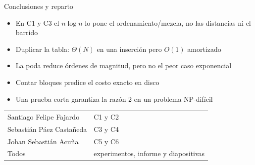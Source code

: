\documentclass[11pt,aspectratio=169]{beamer}
\newcommand{\Th}{\Theta}
\begin{document}
\begin{frame}{Conclusiones y reparto}
\small
\begin{itemize}
\item En C1 y C3 el $n\log n$ lo pone el ordenamiento/mezcla, no las distancias ni el barrido
\item Duplicar la tabla: $\Th(N)$ en una inserción pero $O(1)$ amortizado
\item La poda reduce órdenes de magnitud, pero no el peor caso exponencial
\item Contar bloques predice el costo exacto en disco
\item Una prueba corta garantiza la razón 2 en un problema NP-difícil
\end{itemize}
\medskip
\begin{tabular}{ll}
\toprule
Santiago Felipe Fajardo & C1 y C2 \\
Sebastián Páez Castañeda & C3 y C4 \\
Johan Sebastián Acuña & C5 y C6 \\
Todos & experimentos, informe y diapositivas \\
\bottomrule
\end{tabular}
\end{frame}
\end{document}
